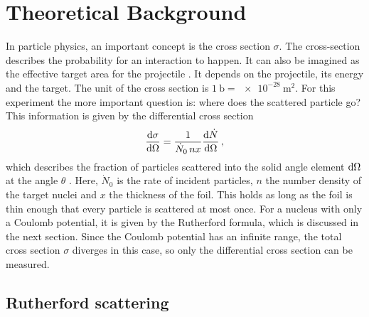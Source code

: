 \section{Theoretical Background}
\label{sec:Theory}
In particle physics, an important concept is the cross section $\sigma$. 
The cross-section describes the probability for an interaction to happen. 
It can also be imagined as the effective target area for the projectile \cite{Povh1995}.
It depends on the projectile, its energy and the target. The unit of the cross section is $\SI{1}{\barn}=\SI{e-28}{\meter\squared}$.
For this experiment the more important question is: where does the scattered particle go?
This information is given by the differential cross section
\begin{equation}
    \frac{\text d \sigma}{\text d \Omega} = \frac{1}{\dot N_0 \, n x}\frac{\text d \dot N}{\text d \Omega} \, ,
    \label{eqn:diffsigma}
\end{equation}
which describes the fraction of particles scattered into the solid angle element $\text d \Omega$ at the angle $\theta$ \cite{Povh1995}.
Here, $\dot N_0$ is the rate of incident particles, $n$ the number density of the target nuclei and $x$ the thickness of the foil.
This holds as long as the foil is thin enough that every particle is scattered at most once.
For a nucleus with only a Coulomb potential, it is given by the Rutherford formula, which is discussed in the next section.
Since the Coulomb potential has an infinite range, the total cross section $\sigma$ diverges in this case, so only the differential cross section can be measured.

\subsection{Rutherford scattering}

